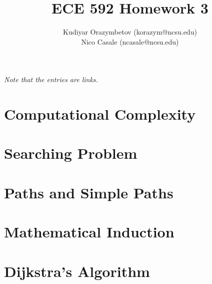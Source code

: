 \documentclass[]{../ncmathy}
\begin{document}
\title{ECE 592 Homework 3}
\author{Kudiyar Orazymbetov (korazym@ncsu.edu)\\Nico Casale (ncasale@ncsu.edu)}
\maketitle

\textit{Note that the entries are links.}
\tableofcontents
\listoffigures
\lstlistoflistings

\pagebreak

\section{Computational Complexity}
	

\section{Searching Problem}
	

\section{Paths and Simple Paths}
	

\section{Mathematical Induction}

	

\pagebreak
	
\section{Dijkstra's Algorithm}

	
\end{document}
